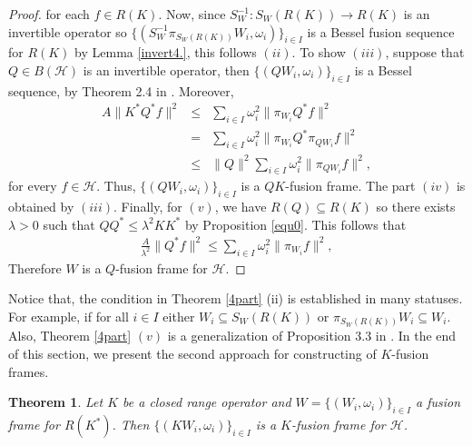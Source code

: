\documentclass{birkjour}
\newtheorem{thm}{Theorem}[section]
\theoremstyle{definition}
\theoremstyle{remark}
\numberwithin{equation}{section}
\begin{document}
\begin{proof}
 for each $f\in R(K)$. Now, since $S_{W}^{-1}: S_{W}(R(K)) \rightarrow R(K)$  is an invertible operator so
 $\lbrace (S_{W}^{-1}\pi_{S_{W}(R(K))}W_{i},
 \omega_{i})\rbrace_{i\in I}$
is a Bessel fusion sequence for $R(K)$ by Lemma \ref{invert4.}, this follows $(ii)$. To show $(iii)$, suppose that  $Q\in B(\mathcal{H})$ is an invertible operator, then $\lbrace (QW_{i}, \omega_{i})\rbrace_{i\in I}$ is a  Bessel sequence, by Theorem 2.4 in \cite{Gav02}. Moreover,
 \begin{eqnarray*}
  A \|K^{*}Q^{*}f\|^{2} &\leq& \sum_{i\in I}\omega_{i}^{2}\|\pi_{W_{i}}Q^{*}f\|^{2}\\
  &=& \sum_{i\in I}\omega_{i}^{2}\|\pi_{W_{i}}Q^{*}\pi_{QW_{i}}f\|^{2}\\
   &\leq& \|Q\|^{2} \sum_{i\in I}\omega_{i}^{2}\|\pi_{QW_{i}}f\|^{2},
 \end{eqnarray*}
    for every $f\in \mathcal{H}$. Thus, $\lbrace (QW_{i}, \omega_{i})\rbrace_{i\in I}$ is a $QK$-fusion frame. The part $(iv)$ is obtained  by $(iii)$.  Finally, for $(v)$, we have $R(Q)\subseteq R(K)$ so there exists $\lambda >0$ such that $QQ^{*} \leq \lambda^{2}KK^{*}$  by Proposition \ref{equ0}. This follows that
    \begin{eqnarray*}
    \frac{A}{\lambda^{2}}\|Q^{*}f\|^{2} \leq \sum_{i\in I}\omega_{i}^{2}\|\pi_{W_{i}}f\|^{2},
     \end{eqnarray*}
Therefore  $W$ is a $Q$-fusion frame for $\mathcal{H}$.
\end{proof}
Notice that, the condition in  Theorem \ref{4part} (ii) is established in many statuses. For example, if  for all $i\in I$  either $W_{i}\subseteq S_{W}(R(K))$ or $\pi_{S_{W}(R(K))}W_{i}\subseteq W_{i}$. Also,
  Theorem \ref{4part} $(v)$ is a generalization of  Proposition 3.3 in \cite{sema}. In the end of this section, we present the second  approach for constructing of  $K$-fusion frames.
\begin{thm}\label{const,K-fusion}
Let  $K$ be a closed range operator and $W = \lbrace (W_{i}, \omega_{i})\rbrace_{i\in I}$
a  fusion frame for $R(K^{*})$.
 Then $\lbrace (KW_{i}, \omega_{i})\rbrace_{i\in
I}$ is a $K$-fusion frame for $\mathcal{H}$.
\end{thm}
\end{document}
